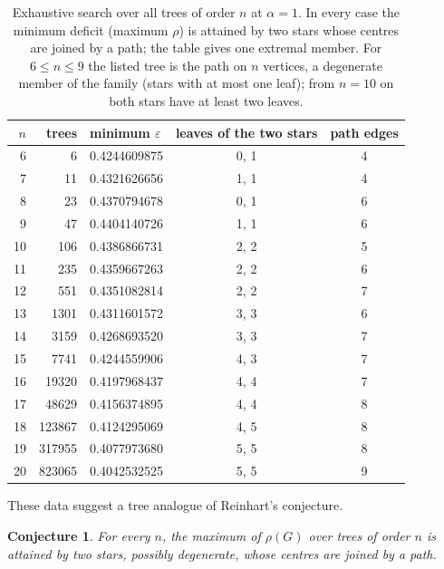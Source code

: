 \documentclass[11pt,a4paper]{article}
\newtheorem{conjecture}[theorem]{Conjecture}
\theoremstyle{definition}
\newcommand{\eps}{\varepsilon}
\begin{document}
\begin{table}[ht]
\centering\small
\begin{tabular}{rrlcc}
\toprule
$n$ & trees & minimum $\eps$ & leaves of the two stars & path edges\\\midrule
6 & 6 & 0.4244609875 & 0, 1 & 4\\
7 & 11 & 0.4321626656 & 1, 1 & 4\\
8 & 23 & 0.4370794678 & 0, 1 & 6\\
9 & 47 & 0.4404140726 & 1, 1 & 6\\
10 & 106 & 0.4386866731 & 2, 2 & 5\\
11 & 235 & 0.4359667263 & 2, 2 & 6\\
12 & 551 & 0.4351082814 & 2, 2 & 7\\
13 & 1301 & 0.4311601572 & 3, 3 & 6\\
14 & 3159 & 0.4268693520 & 3, 3 & 7\\
15 & 7741 & 0.4244559906 & 4, 3 & 7\\
16 & 19320 & 0.4197968437 & 4, 4 & 7\\
17 & 48629 & 0.4156374895 & 4, 4 & 8\\
18 & 123867 & 0.4124295069 & 4, 5 & 8\\
19 & 317955 & 0.4077973680 & 5, 5 & 8\\
20 & 823065 & 0.4042532525 & 5, 5 & 9\\
\bottomrule
\end{tabular}
\caption{Exhaustive search over all trees of order $n$ at $\alpha=1$. In every case the minimum deficit (maximum $\rho$) is attained by two stars whose centres are joined by a path; the table gives one extremal member. For $6\le n\le9$ the listed tree is the path on $n$ vertices, a degenerate member of the family (stars with at most one leaf); from $n=10$ on both stars have at least two leaves.}\label{tab:trees}
\end{table}

These data suggest a tree analogue of Reinhart's conjecture.
\begin{conjecture}\label{conj:tree}
For every $n$, the maximum of $\rho(G)$ over trees of order $n$ is attained by two stars, possibly degenerate, whose centres are joined by a path.
\end{conjecture}
\end{document}
